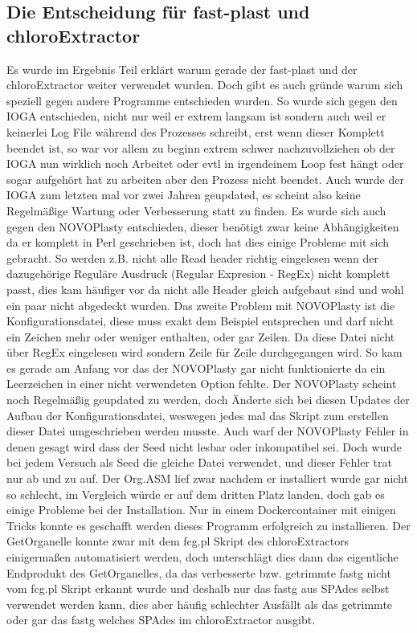 \documentclass{scrartcl}
\begin{document}
\subsection{Die Entscheidung für fast-plast und chloroExtractor}
\label{sec-5-2}
Es wurde im Ergebnis Teil erklärt warum gerade der fast-plast und der chloroExtractor weiter verwendet wurden. Doch gibt es auch gründe warum sich speziell gegen andere Programme entschieden wurden. 
So wurde sich gegen den IOGA entschieden, nicht nur weil er extrem langsam ist sondern auch weil er keinerlei Log File während des Prozesses schreibt, erst wenn dieser Komplett beendet ist, so war vor allem zu beginn 
extrem schwer nachzuvollziehen ob der IOGA nun wirklich noch Arbeitet oder evtl in irgendeinem Loop fest hängt oder sogar aufgehört hat zu arbeiten aber den Prozess nicht beendet. Auch wurde der IOGA zum letzten mal 
vor zwei Jahren geupdated, es scheint also keine Regelmäßige Wartung oder Verbesserung statt zu finden. Es wurde sich auch gegen den NOVOPlasty entschieden, dieser benötigt zwar keine Abhängigkeiten da er komplett 
in Perl geschrieben ist, doch hat dies einige Probleme mit sich gebracht. So werden z.B. nicht alle Read header richtig eingelesen wenn der dazugehörige Reguläre Ausdruck (Regular Expresion - RegEx) nicht komplett passt, dies kam häufiger 
vor da nicht alle Header gleich aufgebaut sind und wohl ein paar nicht abgedeckt wurden. Das zweite Problem mit NOVOPlasty ist die Konfigurationsdatei, diese muss exakt dem Beispiel entsprechen und darf nicht ein Zeichen mehr
oder weniger enthalten, oder gar Zeilen. Da diese Datei nicht über RegEx eingelesen wird sondern Zeile für Zeile durchgegangen wird. So kam es gerade am Anfang vor das der NOVOPlasty gar nicht funktionierte da ein Leerzeichen 
in einer nicht verwendeten Option fehlte. Der NOVOPlasty scheint noch Regelmäßig geupdated zu werden, doch Änderte sich bei diesen Updates der Aufbau der Konfigurationsdatei, weswegen jedes mal das Skript zum erstellen dieser
Datei umgeschrieben werden musste. Auch warf der NOVOPlasty Fehler in denen gesagt wird dass der Seed nicht lesbar oder inkompatibel sei. Doch wurde bei jedem Versuch als Seed die gleiche Datei verwendet, und dieser Fehler trat nur ab und zu auf.
Der Org.ASM lief zwar nachdem er installiert wurde gar nicht so schlecht, im Vergleich würde er auf dem dritten Platz landen, doch gab es einige Probleme bei der Installation. Nur in einem
Dockercontainer mit einigen Tricks konnte es geschafft werden dieses Programm erfolgreich zu installieren. Der GetOrganelle konnte zwar mit dem fcg.pl Skript des chloroExtractors einigermaßen automatisiert werden, doch unterschlägt
dies dann das eigentliche Endprodukt des GetOrganelles, da das verbesserte bzw. getrimmte fastg nicht vom fcg.pl Skript erkannt wurde und deshalb nur das fastg aus SPAdes selbst verwendet werden kann, dies aber häufig schlechter
Ausfällt als das getrimmte oder gar das fastg welches SPAdes im chloroExtractor ausgibt. 
\end{document}
